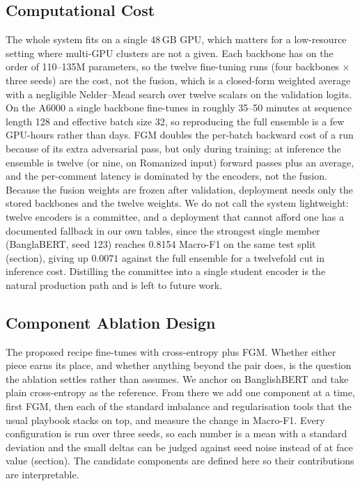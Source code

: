 \documentclass[11pt,a4paper]{article}
\def\cref#1{section}%
\begin{document}
\subsection{Computational Cost}
\label{sec:cost}

The whole system fits on a single 48\,GB GPU, which matters for a low-resource setting where multi-GPU clusters are not a given. Each backbone has on the order of 110--135M parameters, so the twelve fine-tuning runs (four backbones $\times$ three seeds) are the cost, not the fusion, which is a closed-form weighted average with a negligible Nelder--Mead search over twelve scalars on the validation logits. On the A6000 a single backbone fine-tunes in roughly 35--50 minutes at sequence length 128 and effective batch size 32, so reproducing the full ensemble is a few GPU-hours rather than days. FGM doubles the per-batch backward cost of a run because of its extra adversarial pass, but only during training; at inference the ensemble is twelve (or nine, on Romanized input) forward passes plus an average, and the per-comment latency is dominated by the encoders, not the fusion. Because the fusion weights are frozen after validation, deployment needs only the stored backbones and the twelve weights. We do not call the system lightweight: twelve encoders is a committee, and a deployment that cannot afford one has a documented fallback in our own tables, since the strongest single member (BanglaBERT, seed 123) reaches 0.8154 Macro-F1 on the same test split (\cref{tab:perrun}), giving up $0.0071$ against the full ensemble for a twelvefold cut in inference cost. Distilling the committee into a single student encoder is the natural production path and is left to future work.

\subsection{Component Ablation Design}
\label{sec:ablation-design}

The proposed recipe fine-tunes with cross-entropy plus FGM. Whether either piece earns its place, and whether anything beyond the pair does, is the question the ablation settles rather than assumes. We anchor on BanglishBERT and take plain cross-entropy as the reference. From there we add one component at a time, first FGM, then each of the standard imbalance and regularisation tools that the usual playbook stacks on top, and measure the change in Macro-F1. Every configuration is run over three seeds, so each number is a mean with a standard deviation and the small deltas can be judged against seed noise instead of at face value (\cref{sec:ablation-results}). The candidate components are defined here so their contributions are interpretable.
\end{document}
